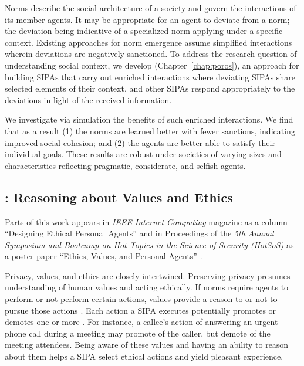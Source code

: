 Norms describe the social architecture of a society
and govern the interactions of its member agents.
It may be appropriate for an agent to deviate from
a norm; the deviation being indicative of a specialized
norm applying under a specific context. Existing
approaches for norm emergence assume simplified
interactions wherein deviations are negatively
sanctioned. To address the research question of understanding
social context, we develop \frameworkB (Chapter~\ref{chap:poros}), an approach for
building SIPAs that carry out enriched interactions
where deviating SIPAs share selected elements of their 
context, and other SIPAs respond appropriately to the deviations in light of the received information.

We investigate via simulation the benefits
of such enriched interactions. We find
that as a result (1) the norms are learned better with
fewer sanctions, indicating improved social cohesion;
and (2) the agents are better able to satisfy
their individual goals. These results are robust under
societies of varying sizes and characteristics reflecting
pragmatic, considerate, and selfish agents.

\subsection[Reasoning about Values and Ethics]{\frameworkAinur: Reasoning about Values and Ethics}

Parts of this work appears in \emph{IEEE Internet Computing} magazine as a column ``Designing Ethical Personal Agents''
\citep{Ajmeri-IC18-Ethical}
and in Proceedings of the \emph{5th Annual Symposium and Bootcamp on Hot Topics in the Science of Security (HotSoS)} as a poster paper ``Ethics, Values, and Personal Agents''
\citep{HotSoS-18:ethics}.

Privacy, values, and ethics are closely intertwined. 
Preserving privacy presumes understanding of human values 
and acting ethically. 
% 
If norms require agents to perform or not perform certain actions,
values provide a reason to or not to pursue those actions
\citep{Dechesne-AIL13-Norms+Values}. Each action a \frameworkB SIPA
executes potentially promotes or demotes one or more .
For instance, a callee's action of
answering an urgent phone call during a meeting may promote 
of the caller, but demote  of the meeting attendees. 
Being aware of these values and having an ability to reason about them 
helps a SIPA select ethical actions and yield pleasant experience.

